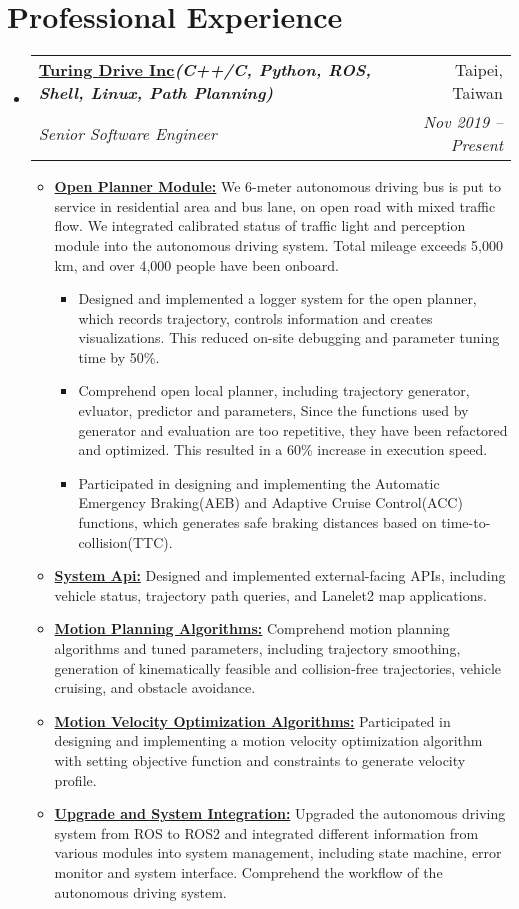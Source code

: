\documentclass[letterpaper,11pt]{article}
\makeatletter
\newcommand{\resumeItem}[1]{
  \item\small{
    {#1 \vspace{-2pt}}
  }
}
\newcommand{\resumeSubheading}[4]{
  \vspace{-2pt}\item
    \begin{tabular*}{0.97\textwidth}[t]{l@{\extracolsep{\fill}}r}
      \textbf{#1} & #2 \\
      \textit{\small#3} & \textit{\small #4} \\
    \end{tabular*}\vspace{-7pt}
}
\newcommand{\resumeSubHeadingListStart}{\begin{itemize}[leftmargin=0.15in, label={}]}
\newcommand{\resumeSubHeadingListEnd}{\end{itemize}}
\newcommand{\resumeItemListStart}{\begin{itemize}}
\newcommand{\resumeItemListEnd}{\end{itemize}\vspace{-5pt}}
\makeatother
\begin{document}
\section{\textbf{Professional Experience}}
  \vspace{3pt}
  \resumeSubHeadingListStart

    \resumeSubheading 
      {\href{https://turing-drive.com/zh/home-zh/}{\color{blue}Turing Drive Inc}\emph{\scriptsize{(C++/C, Python, ROS, Shell, Linux, Path Planning)}}}{Taipei, Taiwan}
      {Senior Software Engineer}{Nov 2019 -- Present}
      \resumeItemListStart
      \resumeItem{\underline{\textbf{Open Planner Module:}} We 6-meter autonomous driving bus is put to service in  residential area and bus lane, on open road with mixed traffic flow. We integrated calibrated status of traffic light and perception module into the autonomous driving system. Total mileage exceeds 5,000 km, and over 4,000 people have been onboard.}
      \resumeItemListStart
        \resumeItem{Designed and implemented a logger system for the open planner, which records trajectory, controls information and creates visualizations. This reduced on-site debugging and parameter tuning time by 50\%.}
        \resumeItem{Comprehend open local planner, including trajectory generator, evluator, predictor and parameters, Since the functions used by generator and evaluation are too repetitive, they have been refactored and optimized. This resulted in a 60\% increase in execution speed.}
        \resumeItem{Participated in designing and implementing the Automatic Emergency Braking(AEB) and Adaptive Cruise Control(ACC) functions, which generates safe braking distances based on time-to-collision(TTC).}
      \resumeItemListEnd
      \resumeItem{\underline{\textbf{System Api:}} Designed and implemented external-facing APIs, including vehicle status, trajectory path queries, and Lanelet2 map applications. }
      \resumeItem{\underline{\textbf{Motion Planning Algorithms:}} Comprehend motion planning algorithms and tuned parameters, including trajectory smoothing, generation of kinematically feasible and collision-free trajectories, vehicle cruising, and obstacle avoidance.}
      \resumeItem{\underline{\textbf{Motion Velocity Optimization Algorithms:}} Participated in designing and implementing a motion velocity optimization algorithm with setting objective function and constraints to generate velocity profile.}
      \resumeItem{\underline{\textbf{Upgrade and System Integration:}} Upgraded the autonomous driving system from ROS to ROS2 and integrated different information from various modules into system management, including state machine, error monitor and system interface. Comprehend the workflow of the autonomous driving system.}
    \resumeItemListEnd
  \resumeSubHeadingListEnd
  
\end{document}

